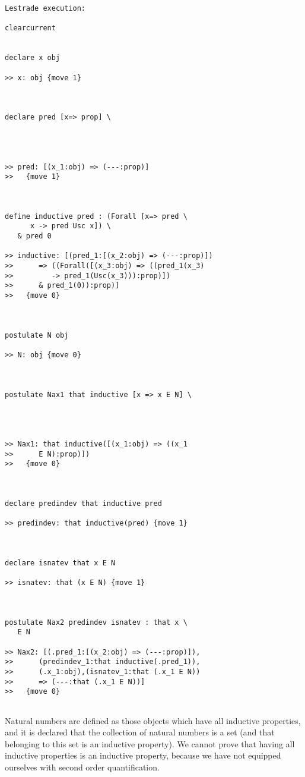 \documentclass[12pt]{article}
\begin{document}
\begin{verbatim}Lestrade execution:

clearcurrent


declare x obj

>> x: obj {move 1}



declare pred [x=> prop] \
   



>> pred: [(x_1:obj) => (---:prop)]
>>   {move 1}



define inductive pred : (Forall [x=> pred \
      x -> pred Usc x]) \
   & pred 0

>> inductive: [(pred_1:[(x_2:obj) => (---:prop)])
>>      => ((Forall([(x_3:obj) => ((pred_1(x_3)
>>         -> pred_1(Usc(x_3))):prop)])
>>      & pred_1(0)):prop)]
>>   {move 0}



postulate N obj

>> N: obj {move 0}



postulate Nax1 that inductive [x => x E N] \
   



>> Nax1: that inductive([(x_1:obj) => ((x_1
>>      E N):prop)])
>>   {move 0}



declare predindev that inductive pred

>> predindev: that inductive(pred) {move 1}



declare isnatev that x E N

>> isnatev: that (x E N) {move 1}



postulate Nax2 predindev isnatev : that x \
   E N

>> Nax2: [(.pred_1:[(x_2:obj) => (---:prop)]),
>>      (predindev_1:that inductive(.pred_1)),
>>      (.x_1:obj),(isnatev_1:that (.x_1 E N))
>>      => (---:that (.x_1 E N))]
>>   {move 0}


\end{verbatim}

Natural numbers are defined as those objects which have all inductive properties, and it is declared that the collection of natural numbers is a set (and that belonging to this set
is an inductive property).  We cannot prove that having all inductive properties is an inductive property, because we have not equipped ourselves with second order quantification.
\end{document}
